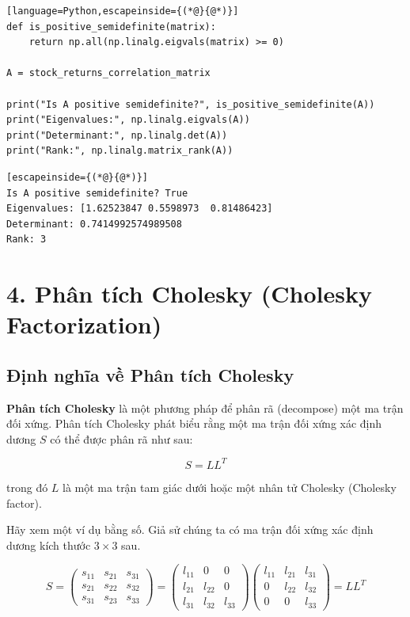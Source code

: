\begin{lstlisting}[language=Python,escapeinside={(*@}{@*)}]
def is_positive_semidefinite(matrix):
    return np.all(np.linalg.eigvals(matrix) >= 0)

A = stock_returns_correlation_matrix

print("Is A positive semidefinite?", is_positive_semidefinite(A))
print("Eigenvalues:", np.linalg.eigvals(A))
print("Determinant:", np.linalg.det(A))
print("Rank:", np.linalg.matrix_rank(A))
\end{lstlisting}

\begin{lstlisting}[escapeinside={(*@}{@*)}]
Is A positive semidefinite? True
Eigenvalues: [1.62523847 0.5598973  0.81486423]
Determinant: 0.7414992574989508
Rank: 3
\end{lstlisting}

\section{4. Phân tích Cholesky (Cholesky Factorization)}

\subsection{Định nghĩa về Phân tích Cholesky}

\textbf{Phân tích Cholesky} là một phương pháp để phân rã (decompose) một ma trận đối xứng. Phân tích Cholesky phát biểu rằng một ma trận đối xứng xác định dương $S$ có thể được phân rã như sau:

\[S = LL^{T}\]

trong đó $L$ là một ma trận tam giác dưới hoặc một nhân tử Cholesky (Cholesky factor).

Hãy xem một ví dụ bằng số. Giả sử chúng ta có ma trận đối xứng xác định dương kích thước $3\times 3$ sau.

\[S =\begin{pmatrix} s_{11} & s_{21} & s_{31} \\ s_{21} & s_{22} & s_{32} \\ s_{31} & s_{23} & s_{33} \end{pmatrix} = \begin{pmatrix} l_{11} & 0 & 0 \\ l_{21} & l_{22} & 0 \\ l_{31} & l_{32} & l_{33} \end{pmatrix} \begin{pmatrix} l_{11} & l_{21} & l_{31} \\ 0 & l_{22} & l_{32} \\ 0 & 0 & l_{33} \end{pmatrix} = LL^{T}\]

